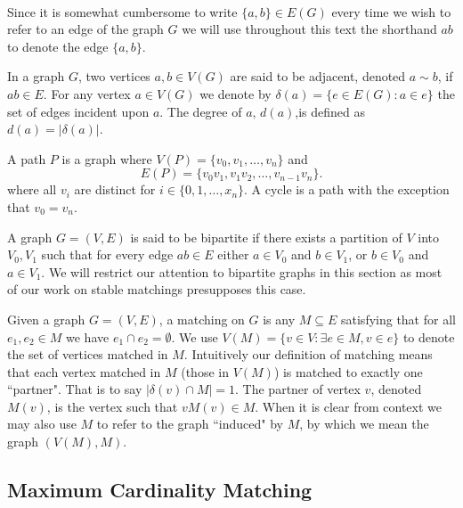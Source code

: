\paragraph{}
Since it is somewhat cumbersome to write $\{a,b\} \in E(G)$ every time we wish to refer to an edge of the graph $G$ we will use throughout this text the shorthand $ab$ to denote the edge $\{a,b\}$.
\begin{definition} In a graph $G$, two vertices $a,b \in V(G)$ are said to be adjacent, denoted $a \sim b$, if $ab \in E$. For any vertex $a \in V(G)$ we denote by $\delta(a) = \{e \in E(G): a\in e\}$ the set of edges incident upon $a$. The degree of $a$, $d(a)$,is defined as $d(a) = |\delta(a)|$.
\end{definition}
\begin{definition}
A path $P$ is a graph where  $V(P) = \{v_0, v_1, \dots, v_n\}$ and 
$$E(P) = \{v_0v_1, v_1v_2, \dots, v_{n-1}v_n\}.$$
where all $v_i$ are distinct for $i \in \{0,1,\dots,x_n\}$. A cycle is a path with the exception that $v_0 = v_n$.
\end{definition}
\begin{definition} A graph $G = (V,E)$ is said to be bipartite if there exists a partition of $V$ into $V_0, V_1$ such that for every edge $ab \in E$ either $a \in V_0$ and $b \in V_1$, or $b \in V_0$ and $a \in V_1$. We will restrict our attention to bipartite graphs in this section as most of our work on stable matchings presupposes this case.
\end{definition}
\begin{definition} Given a graph $G = (V,E)$, a matching on $G$ is any $M \subseteq E$ satisfying that for all $e_1, e_2 \in M$ we have $e_1 \cap e_2 = \emptyset$. We use $V(M) = \{v \in V: \exists e \in M, v \in e\}$ to denote the set of vertices matched in $M$. Intuitively our definition of matching means that each vertex matched in $M$ (those in $V(M)$) is matched to exactly one ``partner". That is to say $|\delta(v) \cap M| = 1$. The partner of vertex $v$, denoted $M(v)$, is the vertex such that $vM(v) \in M$. When it is clear from context we may also use $M$ to refer to the graph ``induced" by $M$, by which we mean the graph $(V(M), M)$.
\end{definition}
\subsection{Maximum Cardinality Matching}\label{subsec:mcm}
